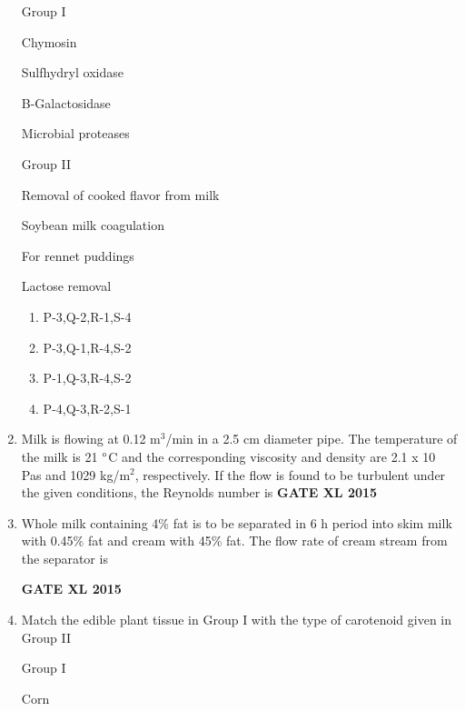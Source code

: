 \documentclass[journal,12pt,onecolumn]{IEEEtran}
\begin{document}
\begin{enumerate}
	\begin{minipage}{0.5\textwidth}\begin{flushleft}
Group I

 Chymosin

 Sulfhydryl oxidase

 B-Galactosidase

 Microbial proteases
	\end{flushleft}
	\end{minipage}
	\begin{minipage}{0.5\textwidth}\begin{flushleft}
Group II

 Removal of cooked flavor from milk

 Soybean milk coagulation

 For rennet puddings

 Lactose removal
	\end{flushleft}

	\end{minipage}

    \begin{enumerate}
            \item P-3,Q-2,R-1,S-4
            \item P-3,Q-1,R-4,S-2
            \item P-1,Q-3,R-4,S-2
            \item P-4,Q-3,R-2,S-1
    \end{enumerate}
\item Milk is flowing at 0.12 m$^3$/min in a 2.5 cm diameter pipe. The temperature of the milk is 21 $\degree$C and the corresponding viscosity and density are 2.1 x 10 Pas and 1029 kg/m$^2$, respectively. If the flow is found to be turbulent under the given conditions, the Reynolds number is
\hfill{\textbf{GATE XL 2015}}
\item Whole milk  containing 4\% fat is to be separated in 6 h period into skim milk with 0.45\% fat and cream with 45\% fat. The flow rate of cream stream  from the separator is


	\hfill{\textbf{GATE XL 2015}}
\item Match the edible plant tissue in Group I with the type of carotenoid given in Group II

	\begin{minipage}{0.5\textwidth}\begin{flushleft}
Group I

 Corn


\end{flushleft}
\end{minipage}
\end{enumerate}
\end{document}
